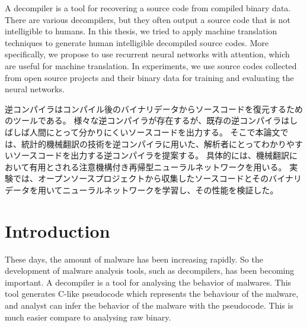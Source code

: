 \documentclass[senior,final,11pt]{iscs-thesis}
\date{December 11, 2018}
\begin{document}
\begin{eabstract}
A decompiler is a tool for recovering a source code from compiled binary data.
There are various decompilers, but they often output a source code that is not intelligible to humans. 
In this thesis, we tried to apply machine translation techniques to generate human intelligible decompiled source codes. 
More specifically, we propose to use recurrent neural networks with attention, which are useful for machine translation. 
In experiments, we use source codes collected from open source projects and their binary data for training and evaluating the neural networks.
\end{eabstract}
\begin{jabstract}
逆コンパイラはコンパイル後のバイナリデータからソースコードを復元するためのツールである。
様々な逆コンパイラが存在するが、既存の逆コンパイラはしばしば人間にとって分かりにくいソースコードを出力する。
そこで本論文では、統計的機械翻訳の技術を逆コンパイラに用いた、解析者にとってわかりやすいソースコードを出力する逆コンパイラを提案する。
具体的には、機械翻訳において有用とされる注意機構付き再帰型ニューラルネットワークを用いる。
実験では、オープンソースプロジェクトから収集したソースコードとそのバイナリデータを用いてニューラルネットワークを学習し、その性能を検証した。
\end{jabstract}

\maketitle

\chapter{Introduction}

These days, the amount of malware has been increasing rapidly.
So the development of malware analysis tools, such as decompilers, has been becoming important.
A decompiler is a tool for analysing the behavior of malwares. 
This tool generates C-like pseudocode which represents the behaviour of the malware, and analyst can infer the behavior of the malware with the pseudocode.
This is much easier compare to analysing raw binary. 
\end{document}
